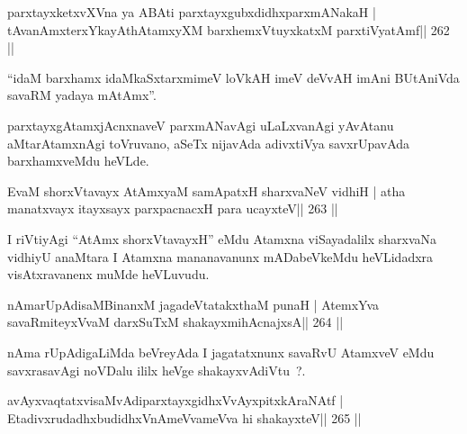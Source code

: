 \begin{shl}
parxtayxketxvXVna ya ABAti parxtayxgubxdidhxparxmANakaH |
tAvanAmxterxYkayAthAtamxyXM barxhemxVtuyxkatxM parxtiVyatAmf\hfill || 262 ||
\end{shl}

\begin{artha}
``idaM barxhamx idaMkaSxtarxmimeV loVkAH imeV deVvAH imAni BUtAniVda savaRM yadaya mAtAmx''.
\end{artha}

\begin{artha}
parxtayxgAtamxjAcnxnaveV parxmANavAgi uLaLxvanAgi yAvAtanu aMtarAtamxnAgi toVruvano, aSeTx nijavAda adivxtiVya savxrUpavAda barxhamxveMdu heVLde.
\end{artha}




\begin{shl}
EvaM shorxVtavayx AtAmx\s yaM samApatxH sharxvaNeV vidhiH |
atha manatxvayx itayxsayx parxpacnacxH para ucayxteV\hfill || 263 ||
\end{shl}

\begin{artha}
I riVtiyAgi ``AtAmx shorxVtavayxH'' eMdu Atamxna viSayadalilx sharxvaNa vidhiyU anaMtara I Atamxna mananavanunx mADabeVkeMdu heVLidadxra visAtxravanenx muMde heVLuvudu.
\end{artha}


\begin{shl}
nAmarUpAdisaMBinanxM jagadeVtatakxthaM punaH |
AtemxYva savaRmiteyxVvaM darxSuTxM shakayxmihAcnajxsA\hfill || 264 ||
\end{shl}

\begin{artha}
nAma rUpAdigaLiMda beVreyAda I jagatatxnunx savaRvU AtamxveV eMdu savxrasavAgi noVDalu ililx heVge shakayxvAdiVtu~?.
\end{artha}


\begin{shl}
avAyxvaqtatxvisaMvAdiparxtayxgidhxVvAyxpitxkAraNAtf |
EtadivxrudadhxbudidhxVnAmeVvameVva hi shakayxteV\hfill || 265 ||
\end{shl}

